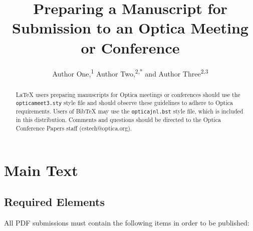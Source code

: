\documentclass[letterpaper,10pt]{article}
\newcommand\authormark[1]{\textsuperscript{#1}}
\begin{document}
\title{Preparing a Manuscript for Submission to an Optica Meeting or Conference}


\author{Author One,\authormark{1} Author Two,\authormark{2,*} and Author Three\authormark{2,3}}

\address{\authormark{1}Publications Department, Optica, 2010 Massachusetts Avenue NW, Washington, DC 20036, USA\\
\authormark{2}Peer Review, Publications Department, Optica, 2010 Massachusetts Avenue NW, Washington, DC 20036, USA\\
\authormark{3}Currently with the Meetings Department, Optica, 2010 Massachusetts Avenue NW, Washington, DC 20036, USA}

\email{\authormark{*}cstech@optica.org} %


\begin{abstract}
\LaTeX{} users preparing manuscripts for Optica meetings or conferences
should use the \texttt{opticameet3.sty} style file and should observe these
guidelines to adhere to Optica requirements. Users of Bib\TeX{} may use the \texttt{opticajnl.bst} style file, which is included in this distribution. Comments and questions should be directed to the Optica Conference Papers staff (cstech@optica.org).
\end{abstract}

\section{Main Text}

\subsection{Required Elements}
All PDF submissions must contain the following items in order to be published:
\end{document}
